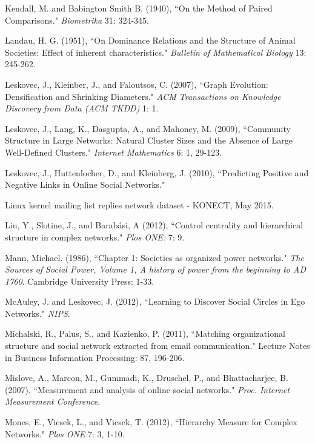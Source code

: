 \documentclass[3p,times]{elsarticle}
\begin{document}
\begin{thebibliography}{9}
	Kendall, M. and Babington Smith B. (1940),
	``On the Method of Paired Comparisons." 
	\textit{Biometrika} 31: 324-345.
	
	Landau, H. G. (1951),
	``On Dominance Relations and the Structure of Animal Societies:  Effect of inherent characteristics." 
	\textit{Bulletin of Mathematical Biology} 13: 245-262.

	Leskovec, J., Kleinber, J., and Faloutsos, C. (2007),
	``Graph Evolution: Densification and Shrinking Diameters."
	\textit{ACM Transactions on Knowledge Discovery from Data (ACM TKDD)} 1: 1.

	Leskovec, J., Lang, K., Dasgupta, A., and Mahoney, M. (2009),
	``Community Structure in Large Networks: Natural Cluster Sizes and the Absence of Large Well-Defined Clusters."
	\textit{Internet Mathematics} 6: 1, 29-123.

	Leskovec, J., Huttenlocher, D., and Kleinberg, J. (2010),
	``Predicting Positive and Negative Links in Online Social Networks."
	
	Linux kernel mailing list replies network dataset - KONECT, May 2015.

	Liu, Y., Slotine, J., and Barab{\'a}si, A (2012),
	``Control centrality and hierarchical structure in complex networks."
	\textit{Plos ONE:} 7: 9.
	
	Mann, Michael. (1986), ``Chapter 1: Societies as organized power networks."
	\textit{The Sources of Social Power, Volume 1, A history of power from the beginning to AD 1760}. Cambridge University Press: 1-33.
	
	McAuley, J. and Leskovec, J. (2012),
	``Learning to Discover Social Circles in Ego Networks."	\textit{NIPS}.
	
	Michalski, R., Palus, S., and Kazienko, P. (2011),
	``Matching organizational structure and social network extracted from email communication."
	Lecture Notes in Business Information Processing: 87, 196-206.
	
	Mislove, A., Marcon, M., Gummadi, K., Druschel, P., and Bhattacharjee, B. (2007),
	``Measurement and analysis of online social networks."
	\textit{Proc. Internet Measurement Conference}.
	
	Mones, E., Vicsek, L., and Vicsek, T. (2012),
	``Hierarchy Measure for Complex Networks." 
	\textit{Plos ONE} 7: 3, 1-10.	
	

\end{thebibliography}
\end{document}
